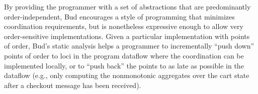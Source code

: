 By providing the programmer with a set of abstractions that are predominantly
order-independent, Bud encourages a style of programming that minimizes
coordination requirements, but is nonetheless expressive enough to allow very
order-sensitive implementations.  Given a particular implementation with points
of order, Bud's static analysis helps a programmer to incrementally ``push
down'' points of order to loci in the program dataflow where the coordination
can be implemented locally, or to ``push back'' the points to as late as
possible in the dataflow (e.g., only computing the nonmonotonic aggregates over
the cart state after a checkout message has been received).


